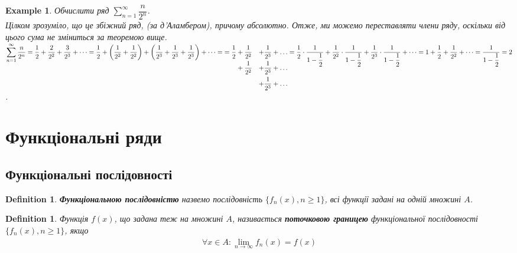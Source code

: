 \documentclass[a4paper, 10pt]{article}
\def\huge{\displaystyle}
\theoremstyle{theoremdd}
\theoremstyle{theoremdd}
\theoremstyle{theoremdd}
\newtheorem{definition}[theorem]{Definition}
\theoremstyle{theoremdd}
\theoremstyle{theoremdd}
\newtheorem{example}[theorem]{Example}
\theoremstyle{theoremdd}
\theoremstyle{theoremdd}
\theoremstyle{theoremdd}
\theoremstyle{theoremdd}
\begin{document}
\begin{example}
Обчислити ряд $\displaystyle\sum_{n=1}^\infty \dfrac{n}{2^n}$.\\
Цілком зрозуміло, що це збіжний ряд, (за д'Аламбером), причому абсолютно. Отже, ми можемо переставляти члени ряду, оскільки від цього сума не зміниться за теоремою вище.\\
$\displaystyle\sum_{n=1}^\infty \dfrac{n}{2^n} = \dfrac{1}{2} + \dfrac{2}{2^2} + \dfrac{3}{2^3} + \dots = \dfrac{1}{2} + \left( \dfrac{1}{2^2} + \dfrac{1}{2^2} \right) + \left( \dfrac{1}{2^3} + \dfrac{1}{2^3} + \dfrac{1}{2^3} \right) + \dots = \\
\begin{aligned}[t]
= \dfrac{1}{2} & + \dfrac{1}{2^2} & + \dfrac{1}{2^3} + \dots \\
& + \dfrac{1}{2^2} & + \dfrac{1}{2^3} + \dots \\
& & + \dfrac{1}{2^3} + \dots
\end{aligned} \\
 = \dfrac{1}{2} \cdot \dfrac{1}{1-\dfrac{1}{2}} + \dfrac{1}{2^2} \cdot \dfrac{1}{1-\dfrac{1}{2}} + \dfrac{1}{2^3} \cdot \dfrac{1}{1-\dfrac{1}{2}} + \dots = 1 + \dfrac{1}{2} + \dfrac{1}{2^2} + \dots = \dfrac{1}{1-\dfrac{1}{2}} = 2$.
\end{example}
\newpage

\section{Функціональні ряди}
\subsection{Функціональні послідовності}
\begin{definition}
\textbf{Функціональною послідовністю} назвемо послідовність $\{f_n(x), n \geq 1 \}$, всі функції задані на одній множині $A$.
\end{definition}

\begin{definition}
Функція $f(x)$, що задана теж на множині $A$, називається \textbf{поточковою границею} функціональної послідовності $\{f_n(x), n \geq 1\}$, якщо
\begin{align*}
\forall x \in A: \lim_{n \to \infty} f_n(x) = f(x)
\end{align*}
\end{definition}

\end{document}
